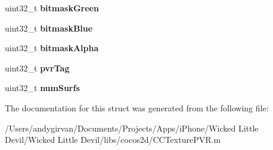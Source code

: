 \begin{DoxyCompactItemize}
\item 
\hypertarget{struct___p_v_r_tex_header_a05d83959b74bf8a8eecc3c5321973459}{uint32\-\_\-t {\bfseries bitmask\-Green}}\label{struct___p_v_r_tex_header_a05d83959b74bf8a8eecc3c5321973459}

\item 
\hypertarget{struct___p_v_r_tex_header_a1b6bbf2a0bde98a4a9e3cf98bf02c0ce}{uint32\-\_\-t {\bfseries bitmask\-Blue}}\label{struct___p_v_r_tex_header_a1b6bbf2a0bde98a4a9e3cf98bf02c0ce}

\item 
\hypertarget{struct___p_v_r_tex_header_a51f3bbd1d5a83b7c9d02649715785361}{uint32\-\_\-t {\bfseries bitmask\-Alpha}}\label{struct___p_v_r_tex_header_a51f3bbd1d5a83b7c9d02649715785361}

\item 
\hypertarget{struct___p_v_r_tex_header_a9bb7e0ba588d1efc77247d488fa96d5c}{uint32\-\_\-t {\bfseries pvr\-Tag}}\label{struct___p_v_r_tex_header_a9bb7e0ba588d1efc77247d488fa96d5c}

\item 
\hypertarget{struct___p_v_r_tex_header_a7c26cd344bcae16ec3e14255df690f83}{uint32\-\_\-t {\bfseries num\-Surfs}}\label{struct___p_v_r_tex_header_a7c26cd344bcae16ec3e14255df690f83}

\end{DoxyCompactItemize}


The documentation for this struct was generated from the following file\-:\begin{DoxyCompactItemize}
\item 
/\-Users/andygirvan/\-Documents/\-Projects/\-Apps/i\-Phone/\-Wicked Little Devil/\-Wicked Little Devil/libs/cocos2d/C\-C\-Texture\-P\-V\-R.\-m\end{DoxyCompactItemize}

